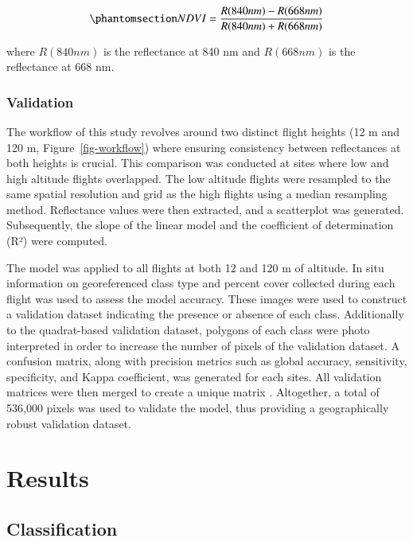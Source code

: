 \documentclass[
  number]{elsarticle}
\begin{document}
\begin{equation}\phantomsection\label{eq-ndvi}{
NDVI = \frac{R(840nm)-R(668nm)}{R(840nm)+R(668nm)}
}\end{equation}

where \(R(840nm)\) is the reflectance at 840 nm and \(R(668nm)\) is the
reflectance at 668 nm.

\subsubsection{Validation}\label{validation}

The workflow of this study revolves around two distinct flight heights
(12 m and 120 m, Figure~\ref{fig-workflow}) where ensuring consistency
between reflectances at both heights is crucial. This comparison was
conducted at sites where low and high altitude flights overlapped. The
low altitude flights were resampled to the same spatial resolution and
grid as the high flights using a median resampling method. Reflectance
values were then extracted, and a scatterplot was generated.
Subsequently, the slope of the linear model and the coefficient of
determination (R²) were computed.

The model was applied to all flights at both 12 and 120 m of altitude.
In situ information on georeferenced class type and percent cover
collected during each flight was used to assess the model accuracy.
These images were used to construct a validation dataset indicating the
presence or absence of each class. Additionally to the quadrat-based
validation dataset, polygons of each class were photo interpreted in
order to increase the number of pixels of the validation dataset. A
confusion matrix, along with precision metrics such as global accuracy,
sensitivity, specificity, and Kappa coefficient, was generated for each
sites. All validation matrices were then merged to create a unique
matrix . Altogether, a total of 536,000 pixels was used to validate the
model, thus providing a geographically robust validation dataset.

\section{Results}\label{results}

\subsection{Classification}\label{classification}
\end{document}
